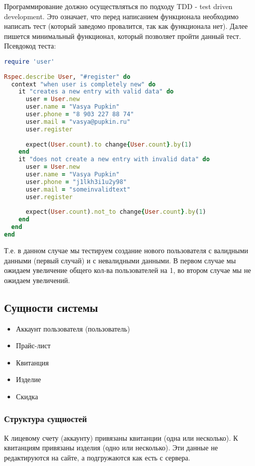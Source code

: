 \documentclass[DIV=calc, paper=a4, fontsize=11pt]{scrartcl} %
\begin{document}
Программирование должно осуществляться по подходу TDD - test driven development. Это означает, что перед написанием функционала необходимо написать тест (который заведомо провалится, так как функционала нет). Далее пишется минимальный функционал, который позволяет пройти данный тест.
\\[0.5cm]
Псевдокод теста:
\begin{lstlisting}[language=Ruby]
require 'user'
	
Rspec.describe User, "#register" do
  context "when user is completely new" do
	it "creates a new entry with valid data" do
	  user = User.new
      user.name = "Vasya Pupkin"
	  user.phone = "8 903 227 88 74"
	  user.mail = "vasya@pupkin.ru"
	  user.register
				
	  expect(User.count).to change{User.count}.by(1)
	end
    it "does not create a new entry with invalid data" do
      user = User.new
	  user.name = "Vasya Pupkin"
	  user.phone = "j1lkh3i1u2y98"
	  user.mail = "someinvalidtext"
	  user.register	
		
      expect(User.count).not_to change{User.count}.by(1)
	end
  end
end
\end{lstlisting}
Т.е. в данном случае мы тестируем создание нового пользователя с валидными данными (первый случай) и с невалидными данными. В первом случае мы ожидаем увеличение общего кол-ва пользователей на 1, во втором случае мы не ожидаем увеличений.

\subsection{Сущности системы}

\begin{itemize}
	\item Аккаунт пользователя (пользователь)
	\item Прайс-лист
	\item Квитанция
	\item Изделие
	\item Скидка
\end{itemize}

\subsubsection{Структура сущностей}

К лицевому счету (аккаунту) привязаны квитанции (одна или несколько). К квитанциям привязаны изделия (одно или несколько). Эти данные не редактируются на сайте, а подгружаются как есть с сервера.
\end{document}
